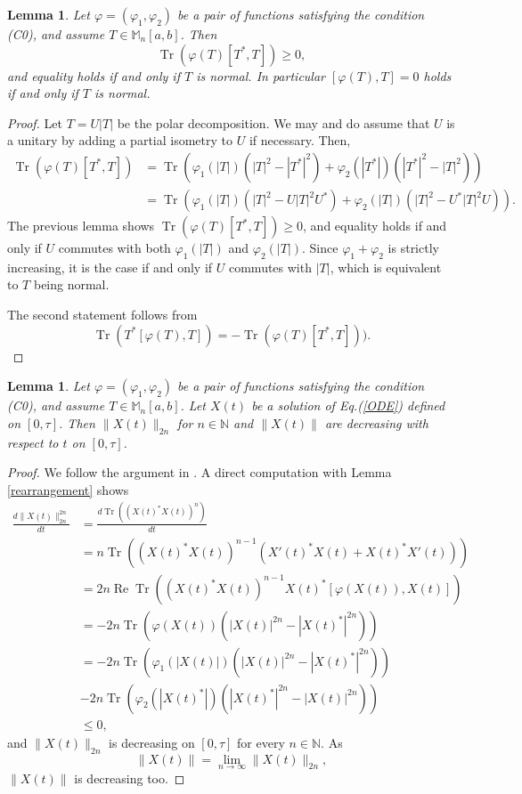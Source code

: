 \documentclass[12pt]{article}
\newtheorem{lemma}[theorem]{Lemma}
\theoremstyle{definition}
\numberwithin{equation}{section}
\newcommand{\M}{\mathbb{M}}
\newcommand{\N}{\mathbb{N}}
\DeclareMathOperator{\Tr}{Tr}
\renewcommand{\Re}{\operatorname{Re}}
\begin{document}
\begin{lemma}\label{positive semi-definite}
Let $\varphi=(\varphi_1,\varphi_2)$ be a pair of functions satisfying the condition (C0), 
and assume $T\in \M_n[a,b]$. 
Then 
\[\Tr(\varphi(T)[T^*,T])\geq 0,\]
and equality holds if and only if $T$ is normal. 
In particular $[\varphi(T),T]=0$ holds if and only if $T$ is normal. 
\end{lemma}

\begin{proof} Let $T=U|T|$ be the polar decomposition. 
We may and do assume that $U$ is a unitary by adding a partial isometry to $U$ if necessary. 
Then,  
\begin{align*}
\Tr(\varphi(T)[T^*,T])&=\Tr(\varphi_1(|T|)(|T|^2-|T^*|^2)+\varphi_2(|T^*|)(|T^*|^2-|T|^2)) \\
&=\Tr(\varphi_1(|T|)(|T|^2-U|T|^2U^*)+\varphi_2(|T|)(|T|^2-U^*|T|^2U)).  
\end{align*}
The previous lemma shows $\Tr(\varphi(T)[T^*,T])\geq 0$, and equality holds if and only if 
$U$ commutes with both $\varphi_1(|T|)$ and $\varphi_2(|T|)$. 
Since $\varphi_1+\varphi_2$ is strictly increasing, it is the case if and only if $U$ commutes 
with $|T|$, which is equivalent to $T$ being normal. 

The second statement follows from 
\[\Tr(T^*[\varphi(T),T])=-\Tr(\varphi(T)[T^*,T])).\] 
\end{proof}


\begin{lemma}\label{decreasing}
Let $\varphi=(\varphi_1,\varphi_2)$ be a pair of functions satisfying the condition (C0), 
and assume $T\in \M_n[a,b]$.  
Let $X(t)$ be a solution of Eq.(\ref{ODE}) defined on $[0,\tau]$. 
Then $\|X(t)\|_{2n}$ for $n\in \N$ and $\|X(t)\|$ are decreasing with respect to $t$ on $[0,\tau]$.  
\end{lemma}

\begin{proof}
We follow the argument in \cite[Section 2]{HS2009}. 
A direct computation with Lemma \ref{rearrangement} shows
\begin{align*}
	\frac{d\|X(t)\|_{2n}^{2n}}{dt} &=\frac{d\Tr((X(t)^*X(t))^{n})}{dt}\\
	&=n\Tr((X(t)^*X(t))^{n-1}(X'(t)^*X(t)+X(t)^*X'(t)))\\
	&=2n\Re \Tr((X(t)^*X(t))^{n-1}X(t)^*[\varphi(X(t)),X(t)])\\
	&=-2n\Tr(\varphi(X(t))(|X(t)|^{2n}-|X(t)^*|^{2n}))\\
	&=-2n\Tr(\varphi_1(|X(t)|)(|X(t)|^{2n}-|X(t)^*|^{2n}))\\
	&-2n\Tr(\varphi_2(|X(t)^*|)(|X(t)^*|^{2n}-|X(t)|^{2n}))\\
	&\leq 0,
\end{align*}
and $\|X(t)\|_{2n}$ is decreasing on $[0,\tau]$ for every $n\in \N$. 
As 
\[\|X(t)\|=\lim_{n\to\infty}\|X(t)\|_{2n},\]
$\|X(t)\|$ is decreasing too. 
\end{proof}
\end{document}

